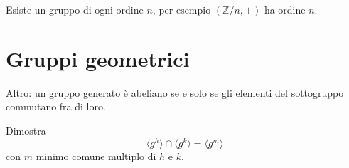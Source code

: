 \documentclass[a4paper]{article}
\begin{document}
Esiste un gruppo di ogni ordine \(n\), per esempio \((\mathbb{Z} / n, +)\) ha ordine \(n\).

\pagebreak

\section{Gruppi geometrici}

%


%



%

Altro: un gruppo generato è abeliano se e solo se gli elementi del
sottogruppo commutano fra di loro.

\begin{snippetexercise}{}
    Dimostra 
    \[
        \langle g^h \rangle \cap \langle g^k \rangle = \langle g^m \rangle
    \]
    con \(m\) minimo comune multiplo di \(h\) e \(k\).
\end{snippetexercise}

\end{document}
